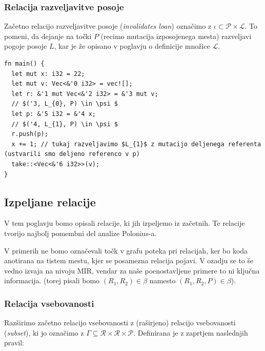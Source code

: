 \documentclass[a4paper,12pt,openright]{book}
\begin{document}
\subsubsection{Relacija razveljavitve posoje}

Začetno relacijo razveljavitve posoje (\textit{invalidates loan}) označimo z $\iota \subset \mathcal{P} \times \mathcal{L}$.
To pomeni, da dejanje na točki $P$ (recimo mutacija izposojenega mesta) razveljavi pogoje posoje $L$, kar
je že opisano v poglavju o definicije množice $\mathcal{L}$.

\begin{listing}[!ht]
	\begin{verbatim}
fn main() {
  let mut x: i32 = 22;
  let mut v: Vec<&'0 i32> = vec![];
  let r: &'1 mut Vec<&'2 i32> = &'3 mut v; 
  // $('3, L_{0}, P) \in \psi $
  let p: &'5 i32 = &'4 x; 
  // $('4, L_{1}, P) \in \psi $
  r.push(p);
  x += 1; // tukaj razveljavimo $L_{1}$ z mutacijo deljenega referenta (ustvarili smo deljeno referenco v p)
  take::<Vec<&'6 i32>>(v);
}
\end{verbatim}
	\caption{Primer razveljavitve posoje}
	\label{listing:loanInvalidated}
\end{listing}

\subsection{Izpeljane relacije}

V tem poglavju bomo opisali relacije, ki jih izpeljemo iz začetnih. Te relacije tvorijo najbolj pomembni del analize
Polonius-a.

V primerih ne bomo označevali točk v grafu poteka pri relacijah, ker bo koda anotirana na tistem mestu, kjer
se posamezna relacija pojavi. V ozadju se to še vedno izvaja na nivoju MIR, vendar za naše poenostavljene
primere to ni ključna informacija. (torej pisali bomo $(R_{1}, R_{2}) \in \beta$ namesto $(R_{1}, R_{2}, P) \in \beta$).

\subsubsection{Relacija vsebovanosti}

Razširimo začetno relacijo vsebovanosti z (raširjeno) relacijo vsebovanosti (\textit{subset}), ki jo označimo z
$\Gamma \subseteq \mathcal{R} \times \mathcal{R} \times \mathcal{P}$. Definirana je z zaprtjem naslednjih pravil:
\end{document}

